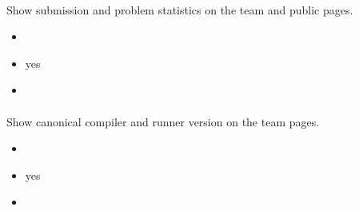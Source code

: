 \documentclass[a4paper,10pt,english,openany]{sphinxmanual}
\begin{document}
\paragraph{}
\label{\detokenize{configuration-reference:show-public-stats}}
\sphinxAtStartPar
Show submission and problem statistics on the team and public pages.
\begin{itemize}
\item {} 
\sphinxAtStartPar
{} 

\item {} 
\sphinxAtStartPar
{} yes

\item {} 
\sphinxAtStartPar
{} 

\end{itemize}


\paragraph{}
\label{\detokenize{configuration-reference:show-language-versions}}
\sphinxAtStartPar
Show canonical compiler and runner version on the team pages.
\begin{itemize}
\item {} 
\sphinxAtStartPar
{} 

\item {} 
\sphinxAtStartPar
{} yes

\item {} 
\sphinxAtStartPar
{} 

\end{itemize}
\end{document}

